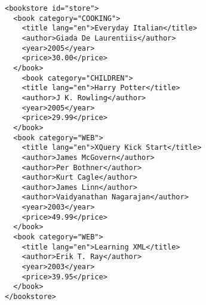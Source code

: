 \documentclass{report}
\begin{document}
\lstset{language=XML}
\begin{lstlisting}
<bookstore id="store">  
  <book category="COOKING">
    <title lang="en">Everyday Italian</title>
    <author>Giada De Laurentiis</author>
    <year>2005</year>
    <price>30.00</price>
  </book>
    <book category="CHILDREN">
    <title lang="en">Harry Potter</title>
    <author>J K. Rowling</author>
    <year>2005</year>
    <price>29.99</price>
  </book>
  <book category="WEB">
    <title lang="en">XQuery Kick Start</title>
    <author>James McGovern</author>
    <author>Per Bothner</author>
    <author>Kurt Cagle</author>
    <author>James Linn</author>
    <author>Vaidyanathan Nagarajan</author>
    <year>2003</year>
    <price>49.99</price>
  </book>
  <book category="WEB">
    <title lang="en">Learning XML</title>
    <author>Erik T. Ray</author>
    <year>2003</year>
    <price>39.95</price>
  </book>
</bookstore> 
\end{lstlisting}
\end{document}
